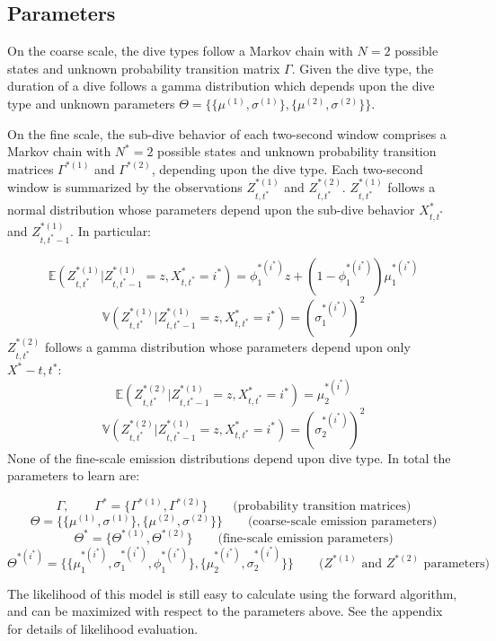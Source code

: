 \subsection{Parameters}

On the coarse scale, the dive types follow a Markov chain with $N=2$ possible states and unknown probability transition matrix $\Gamma$. Given the dive type, the duration of a dive follows a gamma distribution which depends upon the dive type and unknown parameters $\Theta = \{\{\mu^{(1)},\sigma^{(1)}\},\{\mu^{(2)},\sigma^{(2)}\}\}$.

On the fine scale, the sub-dive behavior of each two-second window comprises a Markov chain with $N^*=2$ possible states and unknown probability transition matrices $\Gamma^{*(1)}$ and $\Gamma^{*(2)}$, depending upon the dive type. Each two-second window is summarized by the observations $Z^{*(1)}_{t,t^*}$ and $Z^{*(2)}_{t,t^*}$. $Z^{*(1)}_{t,t^*}$ follows a normal distribution whose parameters depend upon the sub-dive behavior $X^*_{t,t^*}$ and $Z^{*(1)}_{t,t^*-1}$. In particular:

$$\mathbb{E}(Z^{*(1)}_{t,t^*}|Z^{*(1)}_{t,t^*-1} = z,X^*_{t,t^*} = i^*) = \phi_1^{*(i^*)}z + (1-\phi_1^{*(i^*)}) \mu_1^{*(i^*)}$$
$$\mathbb{V}(Z^{*(1)}_{t,t^*}|Z^{*(1)}_{t,t^*-1} = z,X^*_{t,t^*} = i^*) = \left(\sigma_1^{*(i^*)}\right)^2$$
%
$Z^{*(2)}_{t,t^*}$ follows a gamma distribution whose parameters depend upon only $X^*-{t,t^*}$:
%
$$\mathbb{E}(Z^{*(2)}_{t,t^*}|Z^{*(1)}_{t,t^*-1} = z,X^*_{t,t^*} = i^*) = \mu_2^{*(i^*)}$$
$$\mathbb{V}(Z^{*(2)}_{t,t^*}|Z^{*(1)}_{t,t^*-1} = z,X^*_{t,t^*} = i^*) = (\sigma_2^{*(i^*)})^2$$
%
None of the fine-scale emission distributions depend upon dive type. In total the parameters to learn are:

$$\Gamma, \qquad \Gamma^{*} = \{\Gamma^{*(1)},\Gamma^{*(2)}\} \qquad \text{(probability transition matrices)}$$
$$\Theta = \{\{\mu^{(1)},\sigma^{(1)}\},\{\mu^{(2)},\sigma^{(2)}\}\} \qquad \text{(coarse-scale emission parameters)}$$
$$\Theta^* = \{\Theta^{*(1)},\Theta^{*(2)}\}  \qquad \text{(fine-scale emission parameters)}$$
$$\Theta^{*(i^*)} =  \{\{\mu_1^{*(i^*)},\sigma_1^{*(i^*)},\phi_1^{*(i^*)}\},\{\mu_2^{*(i^*)},\sigma_2^{*(i^*)}\}\} \qquad \text{(}Z^{*(1)} \text{ and } Z^{*(2)} \text{ parameters)}$$

The likelihood of this model is still easy to calculate using the forward algorithm, and can be maximized with respect to the parameters above. See the appendix for details of likelihood evaluation.

